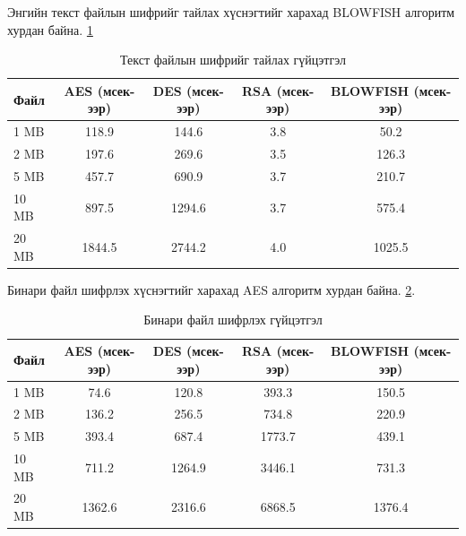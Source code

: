 Энгийн текст файлын шифрийг тайлах хүснэгтийг харахад BLOWFISH алгоритм хурдан байна. \ref{tab:decrypt_performance_text}
\begin{table}[H]
    \caption{Текст файлын шифрийг тайлах гүйцэтгэл}
    \footnotesize
    \begin{tabular}{|l|c|c|c|c|}
        \hline
        \textbf{Файл} & \textbf{AES (мсек-ээр)} & \textbf{DES (мсек-ээр)} & \textbf{RSA (мсек-ээр)} & \textbf{BLOWFISH (мсек-ээр)} \\
        \hline
        1 MB          & 118.9                   & 144.6                   & 3.8                     & 50.2                         \\
        \hline
        2 MB          & 197.6                   & 269.6                   & 3.5                     & 126.3                        \\
        \hline
        5 MB          & 457.7                   & 690.9                   & 3.7                     & 210.7                        \\
        \hline
        10 MB         & 897.5                   & 1294.6                  & 3.7                     & 575.4                        \\
        \hline
        20 MB         & 1844.5                  & 2744.2                  & 4.0                     & 1025.5                       \\
        \hline
    \end{tabular}
    \label{tab:decrypt_performance_text}
\end{table}

Бинари файл шифрлэх хүснэгтийг харахад AES алгоритм хурдан байна. \ref{tab:encrypt_performance_binary}.
\begin{table}[H]
    \caption{Бинари файл шифрлэх гүйцэтгэл}
    \footnotesize
    \begin{tabular}{|l|c|c|c|c|}
        \hline
        \textbf{Файл} & \textbf{AES (мсек-ээр)} & \textbf{DES (мсек-ээр)} & \textbf{RSA (мсек-ээр)} & \textbf{BLOWFISH (мсек-ээр)} \\
        \hline
        1 MB          & 74.6                    & 120.8                   & 393.3                   & 150.5                        \\
        \hline
        2 MB          & 136.2                   & 256.5                   & 734.8                   & 220.9                        \\
        \hline
        5 MB          & 393.4                   & 687.4                   & 1773.7                  & 439.1                        \\
        \hline
        10 MB         & 711.2                   & 1264.9                  & 3446.1                  & 731.3                        \\
        \hline
        20 MB         & 1362.6                  & 2316.6                  & 6868.5                  & 1376.4                       \\
        \hline
    \end{tabular}
    \label{tab:encrypt_performance_binary}
\end{table}

